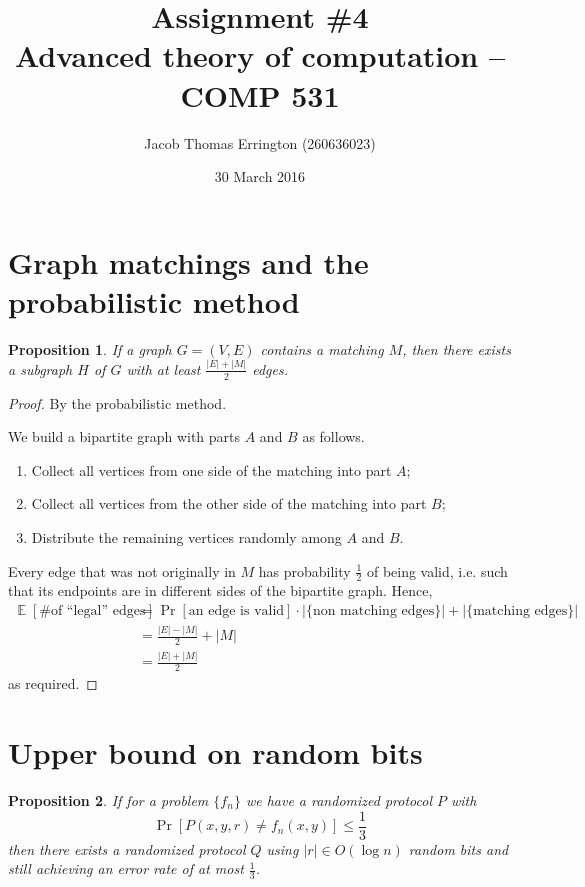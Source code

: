 \documentclass[letterpaper,11pt]{article}
\author{Jacob Thomas Errington (260636023)}
\title{Assignment \#4\\Advanced theory of computation -- COMP 531}
\date{30 March 2016}
\newtheorem{prop}{Proposition}
\DeclareMathOperator{\PrOp}{Pr}
\DeclareMathOperator{\EOp}{\mathbb{E}}
\renewcommand{\Pr}[1]{\PrOp{\left[\text{#1}\right]}}
\newcommand{\E}[1]{\EOp{\left[\text{#1}\right]}}
\begin{document}
\maketitle

\section{Graph matchings and the probabilistic method}

\begin{prop}
    If a graph $G = (V, E)$ contains a matching $M$, then there exists a
    subgraph $H$ of $G$ with at least $\frac{|E| + |M|}{2}$ edges.
\end{prop}

\begin{proof} By the probabilistic method.

    We build a bipartite graph with parts $A$ and $B$ as follows.
    \begin{enumerate}
        \item
            Collect all vertices from one side of the matching into part $A$;

        \item
            Collect all vertices from the other side of the matching into part
            $B$;

        \item
            Distribute the remaining vertices randomly among $A$ and $B$.
    \end{enumerate}

    Every edge that was not originally in $M$ has probability $\frac{1}{2}$ of
    being valid, i.e. such that its endpoints are in different sides of the
    bipartite graph. Hence,
    \begin{align*}
        \E{\# of ``legal'' edges}
        &= \Pr{an edge is valid} \cdot |\{\text{non matching edges}\}|
        + |\{\text{matching edges}\}| \\
        &= \frac{|E| - |M|}{2} + |M| \\
        &= \frac{|E| + |M|}{2}
    \end{align*}
    as required.
\end{proof}

\section{Upper bound on random bits}

\begin{prop}
    If for a problem $\{f_n\}$ we have a randomized protocol $P$ with
    \begin{equation*}
        \Pr{$P(x, y, r) \neq f_n(x, y)$} \leq \frac{1}{3}
    \end{equation*}
    then there exists a randomized protocol $Q$ using $|r| \in O(\log n)$
    random bits and still achieving an error rate of at most $\frac{1}{3}$.
\end{prop}
\end{document}
